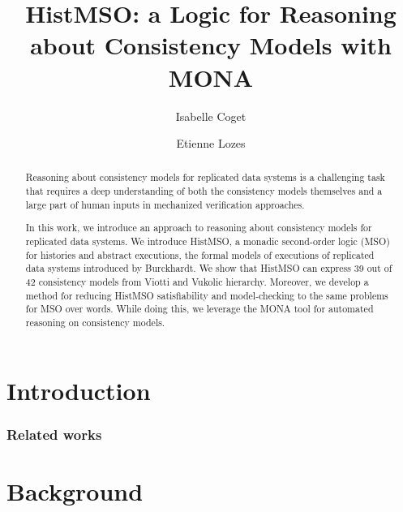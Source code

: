 \documentclass[runningheads]{llncs}
\begin{document}
\title{HistMSO: a Logic for Reasoning about Consistency Models with MONA}

\author{Isabelle Coget \and
Etienne Lozes}



\maketitle

\begin{abstract}
Reasoning about consistency models for replicated data systems is a challenging task that requires a deep understanding of both the consistency models themselves and a large part of human inputs in mechanized verification approaches.

In this work, we introduce an approach to reasoning about consistency models for replicated data systems. 
We introduce HistMSO, a monadic second-order logic (MSO) for histories and abstract executions, the formal models of executions of replicated data systems introduced by Burckhardt. 
We show that HistMSO can express 39 out of 42 consistency models from Viotti and Vukolic hierarchy. 
Moreover, we develop a method for reducing HistMSO satisfiability and model-checking to the same problems for MSO over words. 
While doing this, we leverage the MONA tool for automated reasoning on consistency models.

\end{abstract}

\section{Introduction\label{sec:intro}}


\subsubsection{Related works}


\section{Background\label{sec:background}}

\end{document}
